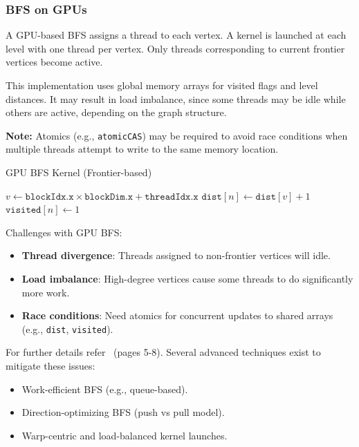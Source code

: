 \documentclass[12pt]{book}
\begin{document}
\subsubsection{BFS on GPUs}

A GPU-based BFS assigns a thread to each vertex. A kernel is launched at each level with one thread per vertex. Only threads corresponding to current frontier vertices become active.

This implementation uses global memory arrays for visited flags and level distances. It may result in load imbalance, since some threads may be idle while others are active, depending on the graph structure.

\textbf{Note:} Atomics (e.g., \texttt{atomicCAS}) may be required to avoid race conditions when multiple threads attempt to write to the same memory location.

\begin{algorithm}[H]
\caption{GPU BFS Kernel (Frontier-based)}
\label{alg:GPUBFS}
\begin{algorithmic}[1]
    \State $v \gets \texttt{blockIdx.x} \times \texttt{blockDim.x} + \texttt{threadIdx.x}$
                \State $\texttt{dist}[n] \gets \texttt{dist}[v] + 1$
                \State $\texttt{visited}[n] \gets 1$
            \EndIf
        \EndFor
    \EndIf
\EndProcedure
\end{algorithmic}
\end{algorithm}

\noindent
Challenges with GPU BFS:
\begin{itemize}
    \item \textbf{Thread divergence}: Threads assigned to non-frontier vertices will idle.
    \item \textbf{Load imbalance}: High-degree vertices cause some threads to do significantly more work.
    \item \textbf{Race conditions}: Need atomics for concurrent updates to shared arrays (e.g., \texttt{dist}, \texttt{visited}).
\end{itemize}
For further details refer~\cite{harish2007accelerating} (pages 5-8).
\bigskip
\noindent
Several advanced techniques exist to mitigate these issues:
\begin{itemize}
    \item Work-efficient BFS (e.g., queue-based).
    \item Direction-optimizing BFS (push vs pull model).
    \item Warp-centric and load-balanced kernel launches.
\end{itemize}
\end{document}
